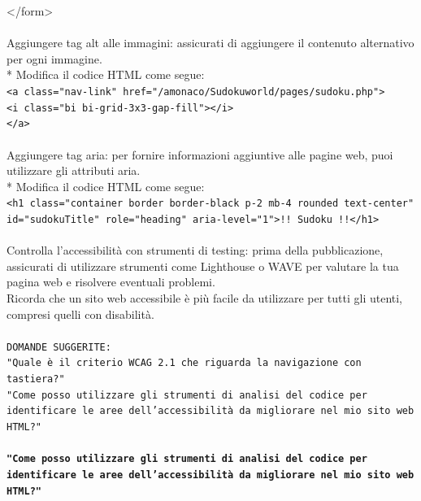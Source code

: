 \begin{adjustwidth}{1cm}{1cm}
{{    </form>}\\
\\Aggiungere tag alt alle immagini: assicurati di aggiungere il contenuto alternativo per ogni immagine.\\
*   Modifica il codice HTML come segue:\\
    \texttt{<a class="nav-link" href="/amonaco/Sudokuworld/pages/sudoku.php">\\
    \indent <i class="bi bi-grid-3x3-gap-fill"></i>\\
    </a>}\\
\\Aggiungere tag aria: per fornire informazioni aggiuntive alle pagine web, puoi utilizzare gli attributi aria.\\
*   Modifica il codice HTML come segue:\\
    \texttt{<h1 class="container border border-black p-2 mb-4 rounded text-center" id="sudokuTitle" role="heading" aria-level="1">!! Sudoku !!</h1>}\\
\\Controlla l'accessibilità con strumenti di testing: prima della pubblicazione, assicurati di utilizzare strumenti come Lighthouse o WAVE per valutare la tua pagina web e risolvere eventuali problemi.\\
Ricorda che un sito web accessibile è più facile da utilizzare per tutti gli utenti, compresi quelli con disabilità.\\
\\
\texttt{DOMANDE SUGGERITE: \\"Quale è il criterio WCAG 2.1 che riguarda la navigazione con tastiera?"
\\"Come posso utilizzare gli strumenti di analisi del codice per identificare le aree dell'accessibilità da migliorare nel mio sito web HTML?"
}}
\end{adjustwidth}

\paragraph*{\texttt{"Come posso utilizzare gli strumenti di analisi del codice per \\ identificare le aree dell'accessibilità da migliorare nel mio sito web HTML?"}} 
\begin{adjustwidth}{1cm}{1cm}
\end{adjustwidth}

